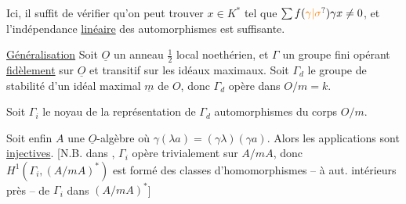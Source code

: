 Ici, il suffit de vérifier qu'on peut trouver $x\in K^*$ tel que $\sum f(\unsure{\gamma|\sigma})\gamma x\ne0$, et l'indépendance \uline{linéaire} des automorphismes est suffisante.

\uline{Généralisation} Soit $\underline{O}$ un anneau $\frac12$ local noethérien, et $\Gamma$ un groupe fini opérant \uline{fidèlement} sur $\underline{O}$ et  transitif sur les idéaux maximaux. Soit $\Gamma_d$ le  groupe de stabilité d'un idéal maximal $\underline{m}$ de $O$, donc $\Gamma_d$ opère dans $O/m=k$.

Soit $\Gamma_i$ le noyau de la représentation de $\Gamma_d$  automorphismes du corps $O/m$.

Soit enfin $A$ une $\underline{O}$-algèbre   où    $\gamma(\lambda a)=(\gamma\lambda)(\gamma a)$. Alors les applications
sont \uline{injectives}. [N.B.  dans ,  $\Gamma_i$ opère trivialement sur $A/mA$, donc $H^1(\Gamma_i,(A/mA)^*)$ est formé des classes d'homomorphismes -- à aut. intérieurs  près -- de $\Gamma_i$ dans $(A/mA)^*$]

